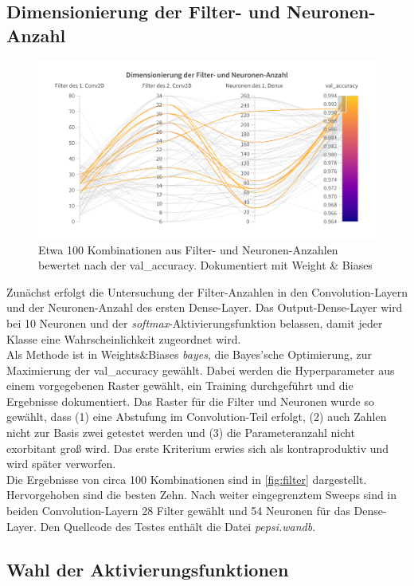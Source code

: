 \documentclass[
fontsize=12pt,					%
paper=a4,						%
twoside=false, 					%
listof=totoc, 					%
bibliography=totoc,				%
titlepage, 						%
headsepline, 					%
DIV=12,							%
BCOR=6mm,						%
cleardoublepage=empty,			%
parskip,							%
ngerman
]{scrartcl}
\begin{document}
\subsection{Dimensionierung der Filter- und Neuronen-Anzahl}

\begin{figure}
	\centering
	\includegraphics[width=0.7\linewidth]{images/Filter}
	\caption{Etwa 100 Kombinationen aus Filter- und Neuronen-Anzahlen bewertet nach der val\_accuracy. Dokumentiert mit Weight \& Biases}
	\label{fig:filter}
\end{figure}

Zunächst erfolgt die Untersuchung der Filter-Anzahlen in den Convolution-Layern und der Neuronen-Anzahl des ersten Dense-Layer. Das Output-Dense-Layer wird bei 10 Neuronen und der \emph{softmax}-Aktivierungsfunktion belassen, damit jeder Klasse eine Wahrscheinlichkeit zugeordnet wird.\\
Als Methode ist in Weights\&Biases \emph{bayes}, die Bayes'sche Optimierung, zur Maximierung der val\_accuracy gewählt. Dabei werden die Hyperparameter aus einem vorgegebenen Raster gewählt, ein Training durchgeführt und die Ergebnisse dokumentiert. Das Raster für die Filter und Neuronen wurde so gewählt, dass (1) eine Abstufung im Convolution-Teil erfolgt, (2) auch Zahlen nicht zur Basis zwei getestet werden und (3) die Parameteranzahl nicht exorbitant groß wird. Das erste Kriterium erwies sich als kontraproduktiv und wird später verworfen.\\
Die Ergebnisse von circa 100 Kombinationen sind in \autoref{fig:filter} dargestellt. Hervorgehoben sind die besten Zehn. Nach weiter eingegrenztem Sweeps sind in beiden Convolution-Layern 28 Filter gewählt und 54 Neuronen für das Dense-Layer. Den Quellcode des Testes enthält die Datei \emph{pepsi.wandb}.\\

\subsection{Wahl der Aktivierungsfunktionen}
\end{document}
